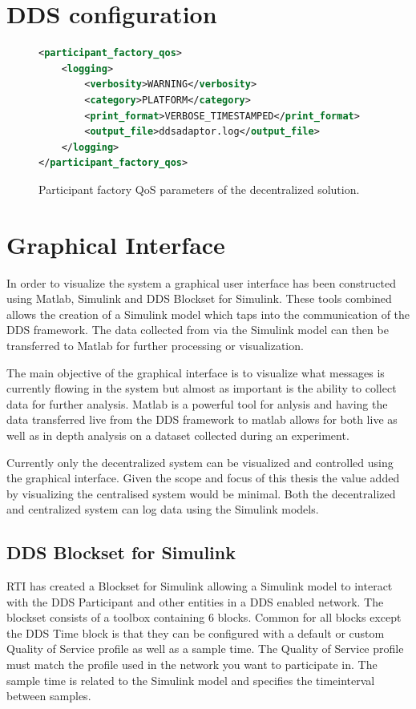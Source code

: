 \section{DDS configuration} \label{sec:decen:ddsconf}

\begin{figure}
\begin{lstlisting}[language=XML]
<participant_factory_qos>
    <logging>
        <verbosity>WARNING</verbosity>
        <category>PLATFORM</category>
        <print_format>VERBOSE_TIMESTAMPED</print_format>
        <output_file>ddsadaptor.log</output_file>
    </logging>
</participant_factory_qos>
\end{lstlisting}
\caption[Decentralized participant factory QoS parameters]{
		\label{fig:decParFacQos} 
		\footnotesize{Participant factory QoS parameters of the decentralized solution.}
	}
\end{figure}

\section{Graphical Interface} \label{sec:graphicalInterface}
In order to visualize the system a graphical user interface has been constructed using Matlab, Simulink and DDS Blockset for Simulink.
These tools combined allows the creation of a Simulink model which taps into the communication of the DDS framework.
The data collected from via the Simulink model can then be transferred to Matlab for further processing or visualization.

The main objective of the graphical interface is to visualize what messages is currently flowing in the system but almost as important is the ability to collect data for further analysis.
Matlab is a powerful tool for anlysis and having the data transferred live from the DDS framework to matlab allows for both live as well as in depth analysis on a dataset collected during an experiment.

Currently only the decentralized system can be visualized and controlled using the graphical interface. Given the scope and focus of this thesis the value added by visualizing the centralised system would be minimal. Both the decentralized and centralized system can log data using the Simulink models.

\subsection{DDS Blockset for Simulink}
RTI has created a Blockset for Simulink allowing a Simulink model to interact with the DDS Participant and other entities in a DDS enabled network.
The blockset consists of a toolbox containing 6 blocks. Common for all blocks except the DDS Time block is that they can be configured with a default or custom Quality of Service profile as well as a sample time. The Quality of Service profile must match the profile used in the network you want to participate in. The sample time is related to the Simulink model and specifies the timeinterval between samples.


